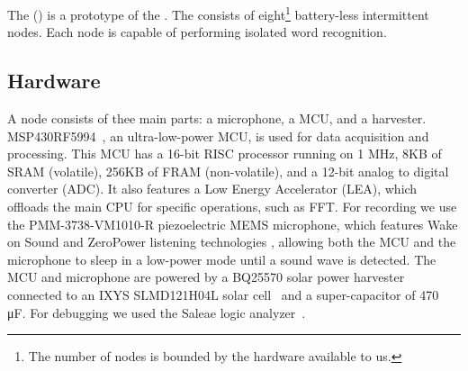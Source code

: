The \fullcim (\cim) is a prototype of the \fullcis. The \cim consists of eight\footnote{The number of nodes is bounded by the hardware available to us.} battery-less intermittent nodes. Each node is capable of performing isolated word recognition. 
%

%
\subsection{Hardware}
\label{sec:hardware}
A \cim node consists of thee main parts: a microphone, a MCU, and a harvester. MSP430RF5994~\cite{ti_msp430_website}, an ultra-low-power MCU, is used for data acquisition and processing. This MCU has a 16-bit RISC processor running on 1 MHz, 8KB of SRAM (volatile), 256KB of FRAM (non-volatile), and a 12-bit analog to digital converter (ADC). It also features a Low Energy Accelerator (LEA), which offloads the main CPU for specific operations, such as FFT. For recording we use the PMM-3738-VM1010-R piezoelectric MEMS microphone, which features Wake on Sound and ZeroPower listening technologies \cite{microphone}, allowing both the MCU and the microphone to sleep in a low-power mode until a sound wave is detected.
The MCU and microphone are powered by a BQ25570 solar power harvester~\cite{BQ25570EVM-206_website} connected to an IXYS SLMD121H04L solar cell~\cite{SLMD121H04L_website} and a super-capacitor of 470 \si{\micro F}. For debugging we used the Saleae logic analyzer~\cite{saleae}.
%
